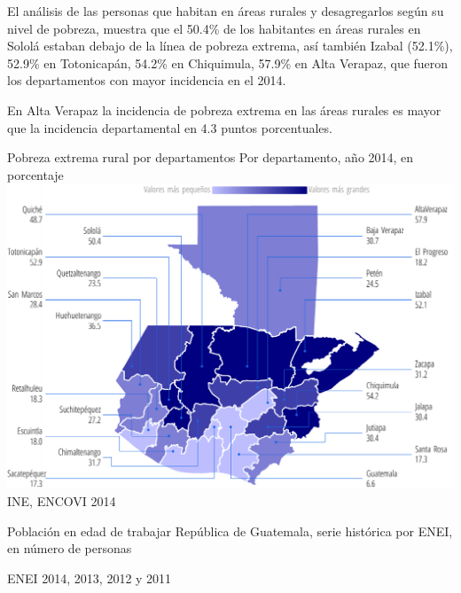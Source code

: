                      
                     {%
                     	El análisis de las personas que habitan en áreas rurales y desagregarlos según su nivel de pobreza, muestra que el 50.4\% de los habitantes en áreas rurales en Sololá estaban debajo de la línea de pobreza extrema, así también Izabal (52.1\%), 52.9\% en Totonicapán, 54.2\% en Chiquimula, 57.9\% en Alta Verapaz, que fueron los departamentos con mayor incidencia en el 2014.
                     	
                     	En Alta Verapaz la incidencia de pobreza extrema en las áreas rurales es mayor que la incidencia departamental en 4.3 puntos porcentuales.}%
                     {%
                     	Pobreza extrema rural por departamentos
                     } %
                     {%
                     	Por departamento, año 2014, en porcentaje} %
                     {%
                     	\includegraphics[width=52\cuadri]{graficas/1_16.pdf}}%
                     {%
                     	INE, ENCOVI 2014} %
         
 
 {%
 }%
 {%
 	Población en edad de trabajar} %
 {%
 	República de Guatemala, serie histórica por ENEI, en número de personas} %
 {%
 	\begin{tikzpicture}[x=1pt,y=1pt]    \end{tikzpicture}}%
 {%
 	ENEI 2014, 2013, 2012 y 2011} %
 
